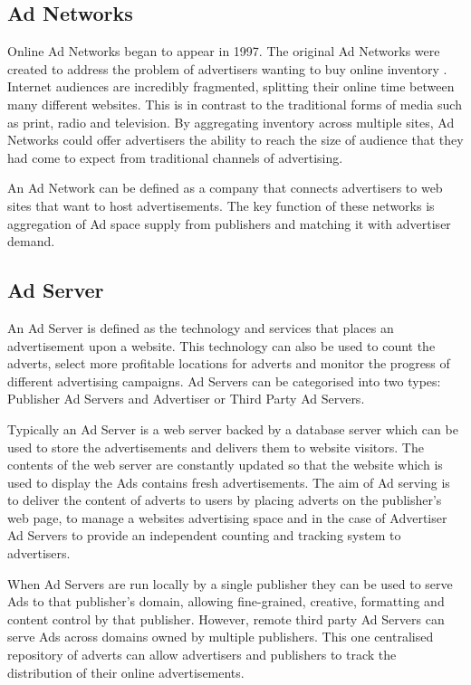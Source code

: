 \documentclass[12pt]{article}
\begin{document}
\subsection{Ad Networks} \label{AdNetwork}
Online Ad Networks began to appear in 1997. The original Ad Networks were created to address the problem of advertisers wanting to buy online inventory \parencite{adExchanges}. Internet audiences are incredibly fragmented, splitting their online time between many different websites. This is in contrast to the traditional forms of media such as print, radio and television. By aggregating inventory across multiple sites, Ad Networks could offer advertisers the ability to reach the size of audience that they had come to expect from traditional channels of advertising. \newline

An Ad Network can be defined as a company that connects advertisers to web sites that want to host advertisements. The key function of these networks is aggregation of Ad space supply from publishers and matching it with advertiser demand. 

\subsection{Ad Server}
An Ad Server is defined as the technology and services that places an advertisement upon a website. This technology can also be used to count the adverts, select more profitable locations for adverts and monitor the progress of different advertising campaigns. Ad Servers can be categorised into two types: Publisher Ad Servers and Advertiser or Third Party Ad Servers. \newline 

Typically an Ad Server is a web server backed by a database server which can be used to store the advertisements and delivers them to website visitors. The contents of the web server are constantly updated so that the website which is used to display the Ads contains fresh advertisements. The aim of Ad serving is to deliver the content of adverts to users by placing adverts on the publisher's web page, to manage a websites advertising space and in the case of Advertiser Ad Servers to provide an independent counting and tracking system to advertisers. \newline 

When Ad Servers are run locally by a single publisher they can be used to serve Ads to that publisher's domain, allowing fine-grained, creative, formatting and content control by that publisher. However, remote third party Ad Servers can serve Ads across domains owned by multiple publishers. This one centralised repository of adverts can allow advertisers and publishers to track the distribution of their online advertisements. 
\end{document}
